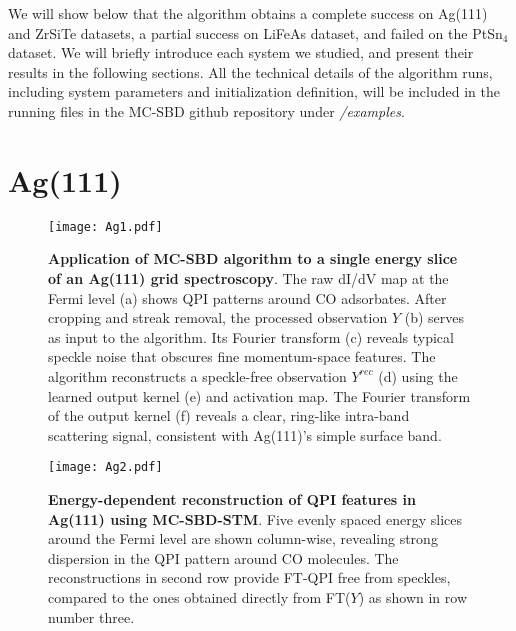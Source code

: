 We will show below that the algorithm obtains a complete success on Ag(111) and ZrSiTe datasets, a partial success on LiFeAs dataset, and failed on the PtSn$_4$ dataset.  We will briefly introduce each system we studied, and present their results in the following sections. All the technical details of the algorithm runs, including system parameters and initialization definition, will be included in the running files in the MC-SBD github repository under \textit{\slash examples}. 

\section{Ag(111)}

\begin{figure}
	\texttt{[image: Ag1.pdf]} 
	\centering
	\caption[\textbf{Application of MC-SBD algorithm to a single energy slice of an Ag(111) grid spectroscopy}]{\textbf{Application of MC-SBD algorithm to a single energy slice of an Ag(111) grid spectroscopy}. The raw dI/dV map at the Fermi level (a) shows QPI patterns around CO adsorbates. After cropping and streak removal, the processed observation $Y$ (b) serves as input to the algorithm. Its Fourier transform (c) reveals typical speckle noise that obscures fine momentum-space features. The algorithm reconstructs a speckle-free observation $Y^{rec}$ (d) using the learned output kernel (e) and activation map. The Fourier transform of the output kernel (f) reveals a clear, ring-like intra-band scattering signal, consistent with Ag(111)’s simple surface band. }
	\label{fig:Ag1}
\end{figure}

\begin{figure}
	\texttt{[image: Ag2.pdf]} 
	\centering
	\caption[\textbf{Energy-dependent reconstruction of QPI features in Ag(111) using MC-SBD-STM}]{\textbf{Energy-dependent reconstruction of QPI features in Ag(111) using MC-SBD-STM}. Five evenly spaced energy slices around the Fermi level are shown column-wise, revealing strong dispersion in the QPI pattern around CO molecules. The reconstructions in second row provide FT-QPI free from speckles, compared to the ones obtained directly from FT($Y$) as shown in row number three.}
	\label{fig:Ag2}
\end{figure}

